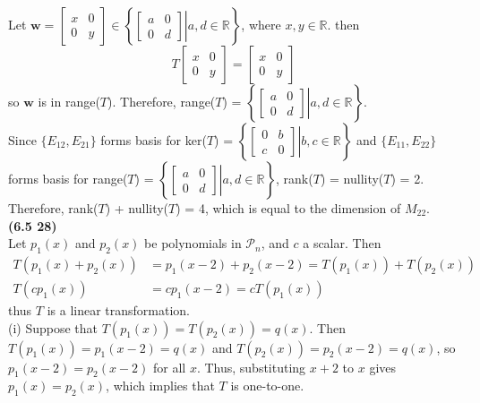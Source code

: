 Let $\textbf{w} = \begin{bmatrix}
	x & 0 \\ 0 & y
\end{bmatrix} \in \left\lbrace\left.\begin{bmatrix}
	a & 0 \\ 0 & d
\end{bmatrix} \right\vert a, d \in \mathbb{R} \right\rbrace$, where $x, y \in \mathbb{R}$. then \begin{equation*}
	T\begin{bmatrix}
		x & 0 \\ 0 & y
	\end{bmatrix} = \begin{bmatrix}
		x & 0 \\ 0 & y
	\end{bmatrix}
\end{equation*} so $\textbf{w}$ is in range($T$). Therefore, range($T$) = $\left\lbrace\left.\begin{bmatrix}
a & 0 \\ 0 & d
\end{bmatrix} \right\vert a, d \in \mathbb{R} \right\rbrace$. \\


Since $\{E_{12}, E_{21}\}$ forms basis for ker($T$) = $\left\lbrace\left.\begin{bmatrix}
0 & b \\ c & 0
\end{bmatrix} \right\vert b, c \in \mathbb{R} \right\rbrace$ and $\{E_{11}, E_{22}\}$ forms basis for range($T$) = $\left\lbrace\left.\begin{bmatrix}
a & 0 \\ 0 & d
\end{bmatrix} \right\vert a, d \in \mathbb{R} \right\rbrace$, rank($T$) = nullity($T$) = 2. Therefore, rank($T$) + nullity($T$) = 4, which is equal to the dimension of $M_{22}$. \\

\textbf{(6.5 28)} \\
Let $p_1(x)$ and $p_2(x)$ be polynomials in $\mathscr{P}_n$, and $c$ a scalar. Then \begin{align*}
	T(p_1(x) + p_2(x)) &= p_1(x - 2) + p_2(x - 2) = T(p_1(x)) + T(p_2(x)) \\
	T(cp_1(x)) &= cp_1(x - 2) = cT(p_1(x))
\end{align*} thus $T$ is a linear transformation. \\

(i) Suppose that $T(p_1(x)) = T(p_2(x)) = q(x)$. Then $T(p_1(x)) = p_1(x - 2) = q(x)$ and $T(p_2(x)) = p_2(x - 2) = q(x)$, so $p_1(x - 2) = p_2(x - 2)$ for all $x$. Thus, substituting $x + 2$ to $x$ gives $p_1(x) = p_2(x)$, which implies that $T$ is one-to-one. \\

